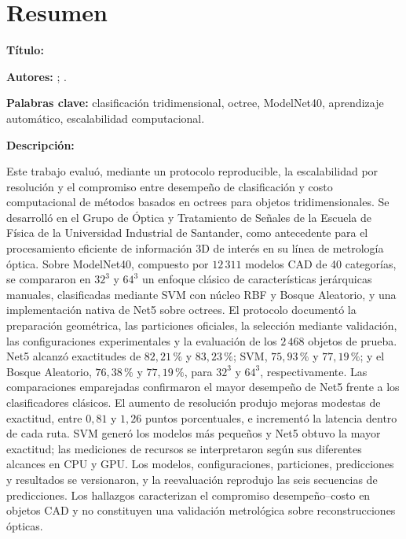 \chapter*{Resumen}

\noindent\textbf{Título:} \TituloTrabajo\footnotemark[1]

\smallskip
\noindent\textbf{Autores:} \AutorUno; \AutorDos.\footnotemark[2]

\smallskip
\noindent\textbf{Palabras clave:} clasificación tridimensional, octree, ModelNet40, aprendizaje automático, escalabilidad computacional.

\smallskip
\noindent\textbf{Descripción:}

Este trabajo evaluó, mediante un protocolo reproducible, la escalabilidad por resolución y el compromiso entre desempeño de clasificación y costo computacional de métodos basados en octrees para objetos tridimensionales. Se desarrolló en el Grupo de Óptica y Tratamiento de Señales de la Escuela de Física de la Universidad Industrial de Santander, como antecedente para el procesamiento eficiente de información 3D de interés en su línea de metrología óptica. Sobre ModelNet40, compuesto por $12\,311$ modelos CAD de 40 categorías, se compararon en $32^3$ y $64^3$ un enfoque clásico de características jerárquicas manuales, clasificadas mediante SVM con núcleo RBF y Bosque Aleatorio, y una implementación nativa de Net5 sobre octrees. El protocolo documentó la preparación geométrica, las particiones oficiales, la selección mediante validación, las configuraciones experimentales y la evaluación de los $2\,468$ objetos de prueba. Net5 alcanzó exactitudes de $82{,}21\,\%$ y $83{,}23\,\%$; SVM, $75{,}93\,\%$ y $77{,}19\,\%$; y el Bosque Aleatorio, $76{,}38\,\%$ y $77{,}19\,\%$, para $32^3$ y $64^3$, respectivamente. Las comparaciones emparejadas confirmaron el mayor desempeño de Net5 frente a los clasificadores clásicos. El aumento de resolución produjo mejoras modestas de exactitud, entre $0{,}81$ y $1{,}26$ puntos porcentuales, e incrementó la latencia dentro de cada ruta. SVM generó los modelos más pequeños y Net5 obtuvo la mayor exactitud; las mediciones de recursos se interpretaron según sus diferentes alcances en CPU y GPU. Los modelos, configuraciones, particiones, predicciones y resultados se versionaron, y la reevaluación reprodujo las seis secuencias de predicciones. Los hallazgos caracterizan el compromiso desempeño--costo en objetos CAD y no constituyen una validación metrológica sobre reconstrucciones ópticas.

